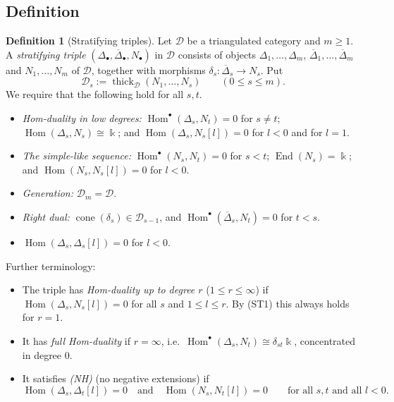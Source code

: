 \documentclass[11pt,reqno]{amsart}
\theoremstyle{plain}
\theoremstyle{definition}
\newtheorem{definition}[theorem]{Definition}
\theoremstyle{remark}
\newcommand{\kk}{\Bbbk}
\DeclareMathOperator{\Hom}{Hom}
\DeclareMathOperator{\End}{End}
\DeclareMathOperator{\cone}{cone}
\newcommand{\thick}[2][\cD]{\operatorname{thick}_{#1}(#2)}
\newcommand{\Deltabar}{\overline{\Delta}}
\newcommand{\cD}{\mathcal{D}}
\begin{document}
\subsection{Definition}

\begin{definition}[Stratifying triples]\label{def:triple}
Let $\cD$ be a triangulated category and $m\ge1$. A \emph{stratifying triple} $(\Delta_\bullet,\Deltabar_\bullet,N_\bullet)$ in $\cD$ consists of objects $\Delta_1,\dots,\Delta_m$, $\Deltabar_1,\dots,\Deltabar_m$ and $N_1,\dots,N_m$ of $\cD$, together with morphisms $\delta_s\colon\Deltabar_s\to N_s$. Put
\[\cD_s:=\thick{N_1,\dots,N_s}\qquad(0\le s\le m).\]
We require that the following hold for all $s,t$.
\begin{itemize}
\item[\textup{(ST1)}] \emph{Hom-duality in low degrees:} $\Hom^\bullet(\Delta_s,N_t)=0$ for $s\ne t$; $\Hom(\Delta_s,N_s)\cong\kk$; and $\Hom(\Delta_s,N_s[l])=0$ for $l<0$ and for $l=1$.
\item[\textup{(ST2)}] \emph{The simple-like sequence:} $\Hom^\bullet(N_s,N_t)=0$ for $s<t$; $\End(N_s)=\kk$; and $\Hom(N_s,N_s[l])=0$ for $l<0$.
\item[\textup{(ST3)}] \emph{Generation:} $\cD_m=\cD$.
\item[\textup{(ST4)}] \emph{Right dual:} $\cone(\delta_s)\in\cD_{s-1}$, and $\Hom^\bullet(\Deltabar_s,N_t)=0$ for $t<s$.
\item[\textup{(ST5)}] $\Hom(\Delta_s,\Delta_s[l])=0$ for $l<0$.
\end{itemize}
Further terminology:
\begin{itemize}
\item The triple has \emph{Hom-duality up to degree $r$} ($1\le r\le\infty$) if $\Hom(\Delta_s,N_s[l])=0$ for all $s$ and $1\le l\le r$. By (ST1) this always holds for $r=1$.
\item It has \emph{full Hom-duality} if $r=\infty$, i.e.\ $\Hom^\bullet(\Delta_s,N_t)\cong\delta_{st}\kk$, concentrated in degree $0$.
\item It satisfies \emph{(NH)} (no negative extensions) if
\[\Hom(\Delta_s,\Delta_t[l])=0\quad\text{and}\quad\Hom(N_s,N_t[l])=0\qquad\text{for all $s,t$ and all $l<0$.}\]
\end{itemize}
\end{definition}
\end{document}
